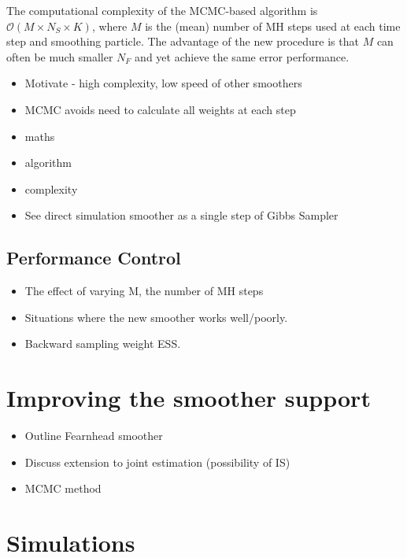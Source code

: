 \documentclass[journal]{IEEEtran}
\begin{document}
The computational complexity of the MCMC-based algorithm is $\mathcal{O}(M \times N_S \times K)$, where $M$ is the (mean) number of MH steps used at each time step and smoothing particle. The advantage of the new procedure is that $M$ can often be much smaller $N_F$ and yet achieve the same error performance.


\begin{itemize}
	\item Motivate - high complexity, low speed of other smoothers
	\item MCMC avoids need to calculate all weights at each step
	\item maths
	\item algorithm
	\item complexity
	\item See direct simulation smoother as a single step of Gibbs Sampler
\end{itemize}

\newpage

\subsection{Performance Control}

\begin{itemize}
	\item The effect of varying M, the number of MH steps
	\item Situations where the new smoother works well/poorly.
	\item Backward sampling weight ESS.
\end{itemize}



\section{Improving the smoother support} \label{sec:new_state_smoother}

\begin{itemize}
	\item Outline Fearnhead smoother
	\item Discuss extension to joint estimation (possibility of IS)
	\item MCMC method
\end{itemize}



\section{Simulations} \label{sec:simulations}
\end{document}
